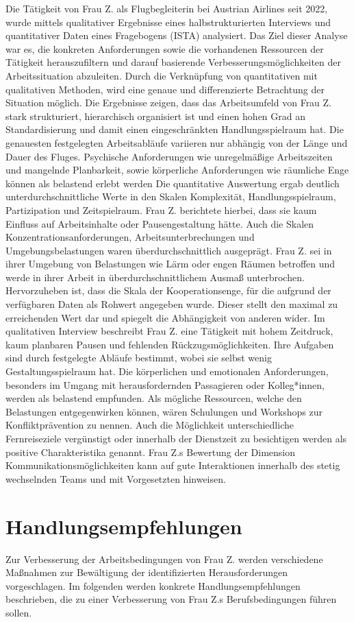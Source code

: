 \documentclass[12pt, a4paper]{article}
\begin{document}
Die Tätigkeit von Frau Z. als Flugbegleiterin bei Austrian Airlines seit 2022, wurde mittels qualitativer Ergebnisse eines 
halbstrukturierten Interviews und quantitativer Daten eines Fragebogens (ISTA) analysiert.
Das Ziel dieser Analyse war es, die konkreten Anforderungen sowie die vorhandenen Ressourcen der Tätigkeit herauszufiltern 
und darauf basierende Verbesserungsmöglichkeiten der Arbeitssituation abzuleiten.
Durch die Verknüpfung von quantitativen mit qualitativen Methoden, wird eine genaue und differenzierte Betrachtung der Situation möglich.
Die Ergebnisse zeigen, dass das Arbeitsumfeld von Frau Z. stark strukturiert, hierarchisch organisiert ist und einen hohen Grad 
an Standardisierung und damit einen eingeschränkten Handlungsspielraum hat. Die genauesten festgelegten Arbeitsabläufe 
variieren nur abhängig von der Länge und Dauer des Fluges. Psychische Anforderungen wie unregelmäßige Arbeitszeiten und mangelnde Planbarkeit, 
sowie körperliche Anforderungen wie räumliche Enge können als belastend erlebt werden
Die quantitative Auswertung ergab deutlich unterdurchschnittliche Werte in den Skalen Komplexität, Handlungsspielraum, 
Partizipation und Zeitspielraum. Frau Z. berichtete hierbei, dass sie kaum Einfluss auf Arbeitsinhalte oder Pausengestaltung hätte. 
Auch die Skalen Konzentrationsanforderungen, Arbeitsunterbrechungen und Umgebungsbelastungen waren überdurchschnittlich ausgeprägt. 
Frau Z. sei in ihrer Umgebung von Belastungen wie Lärm oder engen Räumen betroffen und werde in ihrer Arbeit in überdurchschnittlichem 
Ausmaß unterbrochen. Hervorzuheben ist, dass die Skala der Kooperationsenge, für die aufgrund der verfügbaren Daten als Rohwert angegeben wurde.
Dieser stellt den maximal zu erreichenden Wert dar und spiegelt die Abhängigkeit von anderen wider.
Im qualitativen Interview beschreibt Frau Z. eine Tätigkeit mit hohem Zeitdruck, kaum planbaren Pausen und fehlenden Rückzugsmöglichkeiten.
Ihre Aufgaben sind durch festgelegte Abläufe bestimmt, wobei sie selbst wenig Gestaltungsspielraum hat. 
Die körperlichen und emotionalen Anforderungen, besonders im Umgang mit herausfordernden Passagieren oder Kolleg*innen, 
werden als belastend empfunden.
Als mögliche Ressourcen, welche den Belastungen entgegenwirken können, wären Schulungen und Workshops zur Konfliktprävention zu nennen. 
Auch die Möglichkeit unterschiedliche Fernreiseziele vergünstigt oder innerhalb der Dienstzeit zu besichtigen werden 
als positive Charakteristika genannt. Frau Z.s Bewertung der Dimension Kommunikationsmöglichkeiten kann auf gute Interaktionen 
innerhalb des stetig wechselnden Teams und mit Vorgesetzten hinweisen.

\section{Handlungsempfehlungen}

Zur Verbesserung der Arbeitsbedingungen von Frau Z. werden verschiedene Maßnahmen zur Bewältigung der identifizierten Herausforderungen vorgeschlagen. 
Im folgenden werden konkrete Handlungsempfehlungen beschrieben, die zu einer Verbesserung von Frau Z.s Berufsbedingungen führen sollen.  


\newpage
\printbibliography
\end{document}
